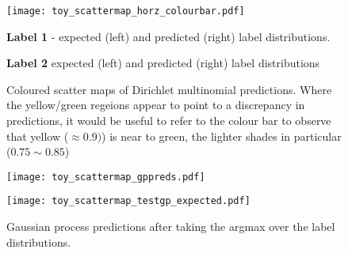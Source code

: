 \begin{figure}
    \texttt{[image: toy\_scattermap\_horz\_colourbar.pdf]}
    \begin{minipage}{\linewidth}
        \caption*{\textbf{Label 1} - expected (left) and predicted (right) label distributions.}
    \end{minipage}
    \begin{minipage}{\linewidth}
        \caption*{\textbf{Label 2} expected (left) and predicted (right) label distributions}
    \end{minipage}
    \caption{Coloured scatter maps of Dirichlet multinomial predictions. Where the yellow/green regeions appear to point to a discrepancy in predictions, it would be useful to refer to the colour bar to observe that yellow ($\approx0.9)$) is near to green, the lighter shades in particular ($0.75 \sim 0.85$)}
    \label{fig:toy_dmpredplots}
\end{figure}

\begin{figure}
    \begin{minipage}{\textwidth}
        \texttt{[image: toy\_scattermap\_gppreds.pdf]}
    \end{minipage}
    \begin{minipage}{\textwidth}
        \texttt{[image: toy\_scattermap\_testgp\_expected.pdf]}
    \end{minipage}
    \caption{Gaussian process predictions after taking the argmax over the label distributions.}
\end{figure}




